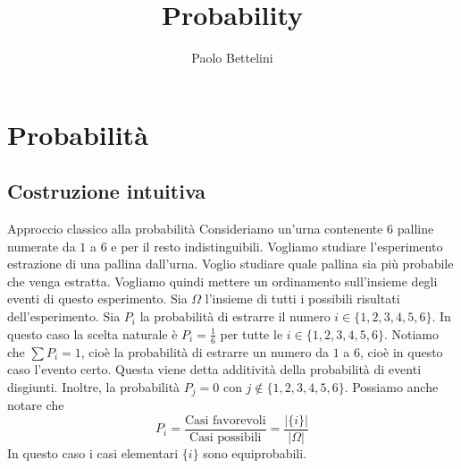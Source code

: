 \documentclass[a4paper]{article}
\title{Probability}
\author{Paolo Bettelini}
\date{}
\begin{document}
\maketitle
\tableofcontents

\pagebreak


\section{Probabilità}

\subsection{Costruzione intuitiva}

\begin{radioactive}
    \begin{snippetexample}{Approccio classico alla probabilità}
        Consideriamo un'urna contenente 6 palline numerate da \(1\) a \(6\) e per il resto indistinguibili.
        Vogliamo studiare l'esperimento estrazione di una pallina dall'urna.
        Voglio studiare quale pallina sia più probabile che venga estratta.
        Vogliamo quindi mettere un ordinamento sull'insieme degli eventi di questo esperimento.
        Sia \(\Omega\) l'insieme di tutti i possibili risultati dell'esperimento.
        Sia \(P_i\) la probabilità di estrarre il numero \(i \in \{1,2,3,4,5,6\}\).
        In questo caso la scelta naturale è \(P_i = \frac16\) per tutte le \(i \in \{1,2,3,4,5,6\}\).
        Notiamo che \(\sum P_i = 1\), cioè la probabilità di estrarre un numero da \(1\) a \(6\), cioè in questo
        caso l'evento certo. Questa viene detta additività della probabilità di eventi disgiunti.
        Inoltre, la probabilità \(P_j = 0\) con \(j \notin \{1,2,3,4,5,6\}\).
        Possiamo anche notare che
        \[
            P_i = \frac{\text{Casi favorevoli}}{\text{Casi possibili}}
            = \frac{
                |\{i\}|
            }{|\Omega|}
        \]
        In questo caso i casi elementari \(\{i\}\) sono equiprobabili.
    \end{snippetexample}
\end{radioactive}
\end{document}
